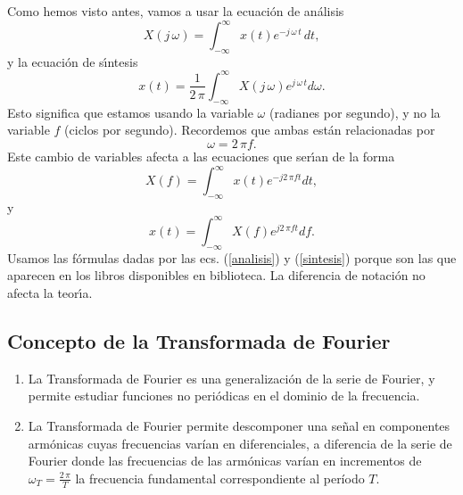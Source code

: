 Como hemos visto antes, vamos a usar la ecuaci\'{o}n de an\'{a}lisis 
\begin{equation}
        X\left( j \, \omega \right) =
                \int_{-\infty }^{\infty }x\left( t\right) e^{-j \, \omega \, t} \, dt,  \label{analisis}
\end{equation}
y la ecuaci\'{o}n de s\'{\i}ntesis 
\begin{equation}
    x\left( t\right) =
   \frac{1}{2 \, \pi }\int_{-\infty }^{\infty }X\left( j \, \omega \right) e^{j \, \omega \, t}d\omega .  \label{sintesis}
\end{equation}
Esto significa que estamos usando la variable $\omega $ (radianes por segundo), y no la variable $f$ 
(ciclos por segundo). Recordemos que ambas est\'{a}n relacionadas por 
\begin{equation}
        \omega =2 \, \pi f.
\end{equation}
Este cambio de variables afecta a las ecuaciones que ser\'{\i}an de la forma 
\begin{equation}
        X\left( f\right) =\int_{-\infty }^{\infty }x\left( t\right) e^{-j2 \, \pi ft}dt,
\end{equation}
y 
\begin{equation}
        x\left( t\right) =\int_{-\infty }^{\infty }X\left( f\right) e^{j2 \, \pi ft}df.
\end{equation}
Usamos las f\'{o}rmulas dadas por las ecs. (\ref{analisis}) y (\ref{sintesis}) porque son las que aparecen 
en los libros disponibles en biblioteca. La diferencia de notaci\'{o}n no afecta la teor\'{\i}a.

\subsection{Concepto de la Transformada de Fourier}

\begin{enumerate}

        \item   La Transformada de Fourier es una generalizaci\'{o}n de la serie de Fourier, y permite estudiar funciones no peri\'{o}dicas en el dominio de la 
        frecuencia.
        
        \item   La Transformada de Fourier permite descomponer una se\~{n}al en componentes arm\'{o}nicas cuyas frecuencias varían en diferenciales, a diferencia de la serie de Fourier donde las frecuencias de las arm\'{o}nicas varían en incrementos de $\omega_{T} = \frac{2 \, \pi}{T}$ la frecuencia fundamental correspondiente al período $T$.

\end{enumerate}

